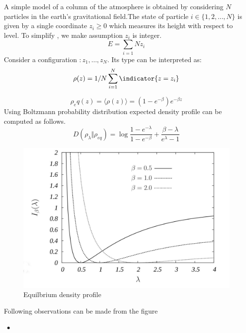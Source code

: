 \documentclass[letterpaper,english,12pt]{article}
\begin{document}
 \begin{exmp}
 
 A simple model of a column of the atmosphere is obtained by considering $N$ particles in the earth's gravitational field.The state of particle $i \in \lbrace 1,2, \dots, N \rbrace $ is given by a single coordinate $z_i\geq 0$ which measures its height with respect to level. To simplify , we make assumption $z_i$ is integer.
 \begin{equation}
     E=\sum_{i=1}{N}z_i
 \end{equation}
 Consider a configuration $:{z_1,\dots,z_N}$. Its type can be interpreted as:
 \begin{equation}
   \rho(z) = \displaystyle 1/N\sum_{i=1}^{N}\indicator{z=z_i}  
 \end{equation}
 
 \begin{equation}
     \rho_eq(z)=\langle \rho(z) \rangle = (1-e^{-\beta})e^{-\beta z}
 \end{equation}
 Using Boltzmann probability distribution expected density profile can be computed as follows.
 \begin{equation}
     D(\rho_{\lambda} \Vert \rho_{eq}) = \log{  \frac{1-e^{-\lambda}}{1-e^{-\beta}}  + \frac{\beta -\lambda}{e^{\lambda}-1}}
 \end{equation}
 
 \begin{figure}[h!]
  \includegraphics[width=\linewidth]{EarthAtmo.jpeg}
  \caption{Equilbrium density profile}
  \label{fig:Earthatmo}
\end{figure}
Following observations can be made from the figure 
\begin{itemize}
    \item 
\end{itemize}
 \end{exmp}
\end{document}
